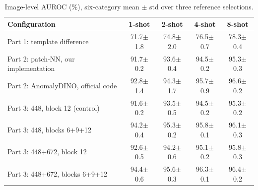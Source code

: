\begin{table}[t]
\centering
\small
\setlength{\tabcolsep}{9pt}
\begin{tabular}{lcccc}
\toprule
Configuration & 1-shot & 2-shot & 4-shot & 8-shot \\
\midrule
Part 1: template difference & 71.7$\pm$1.8 & 74.8$\pm$2.0 & 76.5$\pm$0.7 & 78.3$\pm$0.4 \\
Part 2: patch-NN, our implementation & 91.7$\pm$0.2 & 93.6$\pm$0.4 & 94.5$\pm$0.2 & 95.3$\pm$0.3 \\
Part 2: AnomalyDINO, official code & 92.8$\pm$1.4 & 94.3$\pm$1.7 & 95.7$\pm$0.9 & 96.6$\pm$0.2 \\
\midrule
Part 3: 448, block 12 (control) & 91.6$\pm$0.2 & 93.5$\pm$0.5 & 94.5$\pm$0.2 & 95.3$\pm$0.2 \\
Part 3: 448, blocks 6+9+12 & 94.2$\pm$0.4 & 95.3$\pm$0.2 & 95.8$\pm$0.1 & 96.1$\pm$0.3 \\
Part 3: 448+672, block 12 & 92.6$\pm$0.5 & 94.2$\pm$0.6 & 95.1$\pm$0.2 & 95.8$\pm$0.3 \\
Part 3: 448+672, blocks 6+9+12 & 94.4$\pm$0.6 & 95.6$\pm$0.3 & 96.3$\pm$0.1 & 96.4$\pm$0.2 \\
\bottomrule
\end{tabular}
\caption{Image-level AUROC (\%), six-category mean $\pm$ std over three reference selections.}
\label{tab:image}
\end{table}